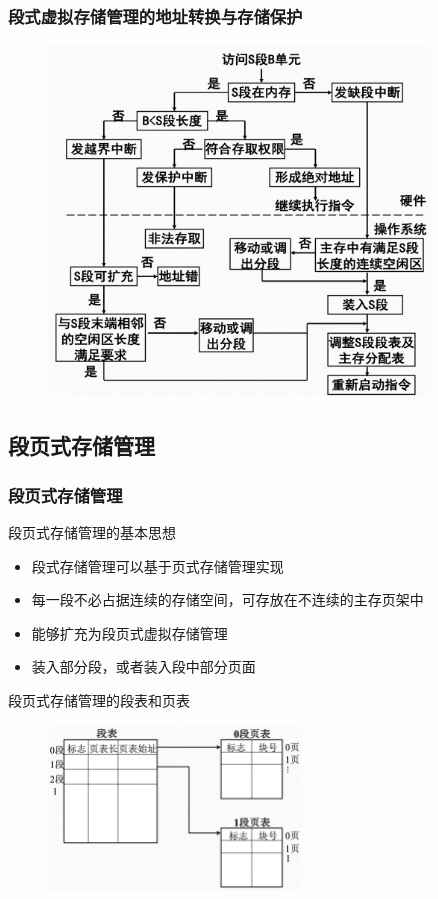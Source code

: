 \documentclass[cs4size,a4paper,10pt]{ctexart}
\begin{document}
		\subsubsection{段式虚拟存储管理的地址转换与存储保护}
		\begin{figure}[H]
			\centering
			\includegraphics[width=0.9\textwidth]{img/3.4.2.3}
		\end{figure}

		\subsection{段页式存储管理}
		\subsubsection{段页式存储管理}
		段页式存储管理的基本思想
		\begin{itemize}
			\item 段式存储管理可以基于页式存储管理实现
			\item 每一段不必占据连续的存储空间，可存放在不连续的主存页架中
			\item 能够扩充为段页式虚拟存储管理
			\item 装入部分段，或者装入段中部分页面
		\end{itemize}

		段页式存储管理的段表和页表
		\begin{figure}[H]
			\centering
			\includegraphics[width=0.6\textwidth]{img/3.4.3.1.1}
		\end{figure}
\end{document}
